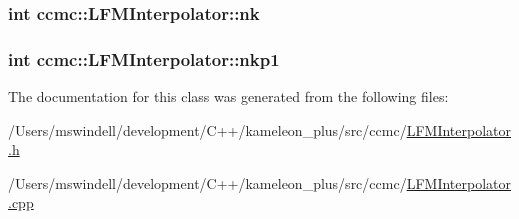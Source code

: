 \hypertarget{classccmc_1_1_l_f_m_interpolator_a5bd5a51d1dc53c2b9b0612ef1b1ab16f}{
\subsubsection[{nk}]{\setlength{\rightskip}{0pt plus 5cm}int ccmc\-::\-L\-F\-M\-Interpolator\-::nk}}\label{classccmc_1_1_l_f_m_interpolator_a5bd5a51d1dc53c2b9b0612ef1b1ab16f}
\hypertarget{classccmc_1_1_l_f_m_interpolator_a4f205cc413dcbb003175d4ac88d353c4}{
\subsubsection[{nkp1}]{\setlength{\rightskip}{0pt plus 5cm}int ccmc\-::\-L\-F\-M\-Interpolator\-::nkp1}}\label{classccmc_1_1_l_f_m_interpolator_a4f205cc413dcbb003175d4ac88d353c4}


The documentation for this class was generated from the following files\-:\begin{DoxyCompactItemize}
\item 
/\-Users/mswindell/development/\-C++/kameleon\-\_\-plus/src/ccmc/\hyperlink{_l_f_m_interpolator_8h}{L\-F\-M\-Interpolator.\-h}\item 
/\-Users/mswindell/development/\-C++/kameleon\-\_\-plus/src/ccmc/\hyperlink{_l_f_m_interpolator_8cpp}{L\-F\-M\-Interpolator.\-cpp}\end{DoxyCompactItemize}
